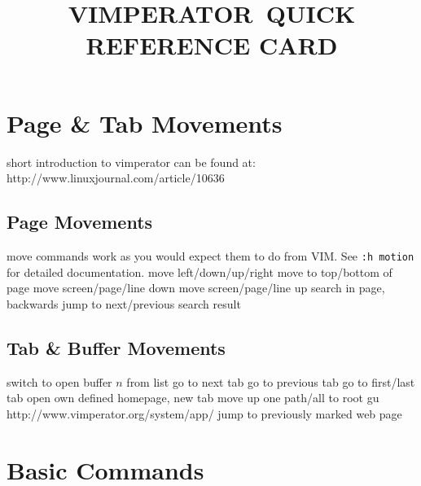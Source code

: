 
\def\content{VIMPERATOR}
\def\versionnumber{1.3}  %

\def\version{v\versionnumber\ \month\ \year}




\title{\uppercase{\content\ quick reference card}}

\shortintro

\section{Page \& Tab Movements}{short introduction to vimperator can be found
at:\\http://www.linuxjournal.com/article/10636}
\subsection{Page Movements}{move commands work as you would expect them to do
from VIM. See {\tt :h motion} for detailed documentation.}
	{move left/down/up/right}
	{move to top/bottom of page}
	{move screen/page/line down}
	{move screen/page/line up}
	{search in page, backwards}
	{jump to next/previous search result}


\subsection{Tab \& Buffer Movements}{}
	{switch to open buffer $n$ from list}
	{go to next tab}
	{go to previous tab}
	{go to first/last tab}
	{open own defined homepage, new tab}
	{move up one path/all to root}
	{gu http://www.vimperator.org/system/app/}
	{jump to previously marked web page}


\section{Basic Commands}{}
